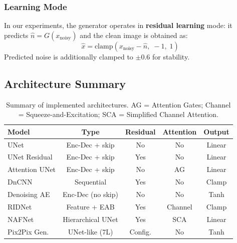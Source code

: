 \subsubsection{Learning Mode}
In our experiments, the generator operates in \textbf{residual learning} mode: it predicts $\hat{n} = G(x_{\text{noisy}})$ and the clean image is obtained as:
\begin{equation}
\hat{x} = \text{clamp}(x_{\text{noisy}} - \hat{n},\; -1,\; 1)
\end{equation}
Predicted noise is additionally clamped to $\pm 0.6$ for stability.

\subsection{Architecture Summary}

\begin{table}[t]
\centering
\small
\setlength{\tabcolsep}{3pt}
\begin{tabular}{lcccc}
\toprule
\textbf{Model} & \textbf{Type} & \textbf{Residual} & \textbf{Attention} & \textbf{Output} \\
\midrule
UNet & Enc-Dec + skip & No & No & Linear \\
UNet Residual & Enc-Dec + skip & Yes & No & Linear \\
Attention UNet & Enc-Dec + skip & No & AG & Linear \\
DnCNN & Sequential & Yes & No & Clamp \\
Denoising AE & Enc-Dec (no skip) & No & No & Tanh \\
RIDNet & Feature + EAB & Yes & Channel & Clamp \\
NAFNet & Hierarchical UNet & Yes & SCA & Linear \\
Pix2Pix Gen. & UNet-like (7L) & Config. & No & Tanh \\
\bottomrule
\end{tabular}
\caption{Summary of implemented architectures. AG = Attention Gates; Channel = Squeeze-and-Excitation; SCA = Simplified Channel Attention.}
\label{tab:architectures}
\end{table}
